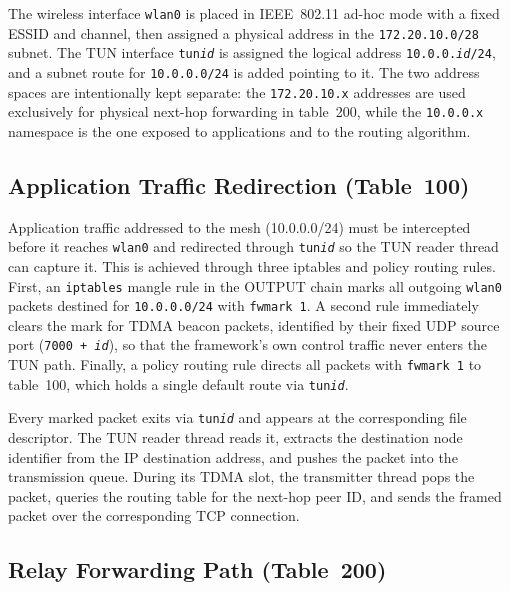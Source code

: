 The wireless interface \texttt{wlan0} is placed in IEEE~802.11 ad-hoc mode with a fixed
ESSID and channel, then assigned a physical address in the \texttt{172.20.10.0/28} subnet.
The TUN interface \texttt{tun\textit{id}} is assigned the logical address
\texttt{10.0.0.\textit{id}/24}, and a subnet route for \texttt{10.0.0.0/24} is added
pointing to it. The two address spaces are intentionally kept separate: the
\texttt{172.20.10.x} addresses are used exclusively for physical next-hop forwarding in
table~200, while the \texttt{10.0.0.x} namespace is the one exposed to applications and
to the routing algorithm.

\subsection{Application Traffic Redirection (Table~100)}

Application traffic addressed to the mesh (10.0.0.0/24) must be intercepted before it
reaches \texttt{wlan0} and redirected through \texttt{tun\textit{id}} so the TUN reader
thread can capture it. This is achieved through three iptables and policy routing rules.
First, an \texttt{iptables} mangle rule in the OUTPUT chain marks all outgoing
\texttt{wlan0} packets destined for \texttt{10.0.0.0/24} with \texttt{fwmark~1}. A second
rule immediately clears the mark for TDMA beacon packets, identified by their fixed UDP
source port (\texttt{7000\,+\,\textit{id}}), so that the framework's own control traffic
never enters the TUN path. Finally, a policy routing rule directs all packets with
\texttt{fwmark~1} to table~100, which holds a single default route via
\texttt{tun\textit{id}}.

Every marked packet exits via \texttt{tun\textit{id}} and appears at the corresponding
file descriptor. The TUN reader thread reads it, extracts the destination node identifier
from the IP destination address, and pushes the packet into the transmission queue. During
its TDMA slot, the transmitter thread pops the packet, queries the routing table for the
next-hop peer ID, and sends the framed packet over the corresponding TCP connection.

\subsection{Relay Forwarding Path (Table~200)}

